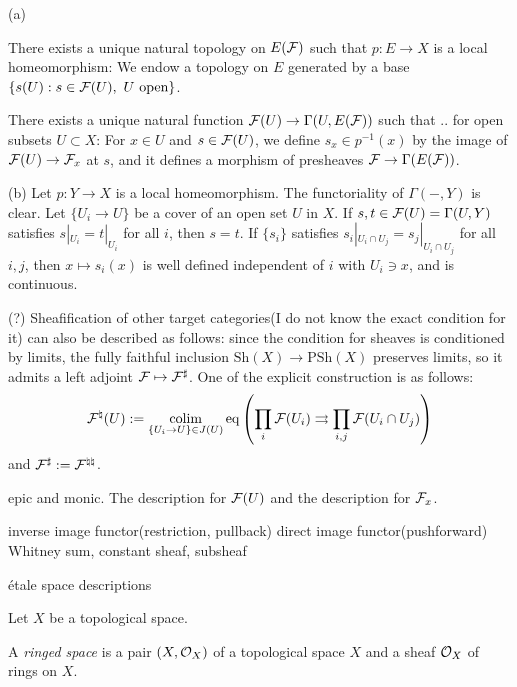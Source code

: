 \documentclass{../../large}
\begin{document}
\begin{pf}
(a)

There exists a unique natural topology on $E(\mathcal{F})$ such that $p:E\to X$ is a local homeomorphism:
We endow a topology on $E$ generated by a base $\{s(U):s\in\cF(U),\ U\text{ open}\}$.

There exists a unique natural function $\mathcal{F}(U)\to\Gamma(U,E(\mathcal{F}))$ such that .. for open subsets $U\subset X$:
For $x\in U$ and $s\in\mathcal{F}(U)$, we define $s_x\in p^{-1}(x)$ by the image of $\mathcal{F}(U)\to\mathcal{F}_x$ at $s$, and it defines a morphism of presheaves $\mathcal{F}\to\Gamma(E(\mathcal{F}))$.

(b)
Let $p:Y\to X$ is a local homeomorphism.
The functoriality of $\Gamma(-,Y)$ is clear.
Let $\{U_i\to U\}$ be a cover of an open set $U$ in $X$.
If $s,t\in\mathcal{F}(U)=\Gamma(U,Y)$ satisfies $s|_{U_i}=t|_{U_i}$ for all $i$, then $s=t$.
If $\{s_i\}$ satisfies $s_i|_{U_i\cap U_j}=s_j|_{U_i\cap U_j}$ for all $i,j$, then $x\mapsto s_i(x)$ is well defined independent of $i$ with $U_i\ni x$, and is continuous.


(?)
Sheafification of other target categories(I do not know the exact condition for it) can also be described as follows:
since the condition for sheaves is conditioned by limits, the fully faithful inclusion $\mathrm{Sh}(X)\to\mathrm{PSh}(X)$ preserves limits, so it admits a left adjoint $\mathcal{F}\mapsto\mathcal{F}^\sharp$.
One of the explicit construction is as follows:
\[\mathcal{F}^\natural(U):=\operatorname*{colim}_{\{U_i\to U\}\in J(U)}\mathrm{eq}\left(\prod_i\mathcal{F}(U_i)\rightrightarrows\prod_{i,j}\mathcal{F}(U_i\cap U_j)\right)\]
and $\mathcal{F}^\sharp:=\mathcal{F}^{\natural\natural}$.

\end{pf}

\begin{prb}
epic and monic.
The description for $\mathcal{F}(U)$ and the description for $\mathcal{F}_x$.
\end{prb}


\begin{prb}
inverse image functor(restriction, pullback)
direct image functor(pushforward)
Whitney sum, constant sheaf, subsheaf

\'etale space descriptions
\begin{parts}
\item
\end{parts}
\end{prb}


\begin{prb}
Let $X$ be a topological space.

A \emph{ringed space} is a pair $(X,\mathcal{O}_X)$ of a topological space $X$ and a sheaf $\mathcal{O}_X$ of rings on $X$.

\end{prb}
\end{document}
